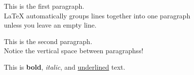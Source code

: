 \documentclass{article}
\begin{document}
    This is the first paragraph.\\
    LaTeX automatically groups lines together into one paragraph\\
    unless you leave an empty line.

    This is the second paragraph.\\
    Notice the vertical space between paragraphss!

    This is \textbf{bold}, \textit{italic}, and \underline{underlined} text.
\end{document}

